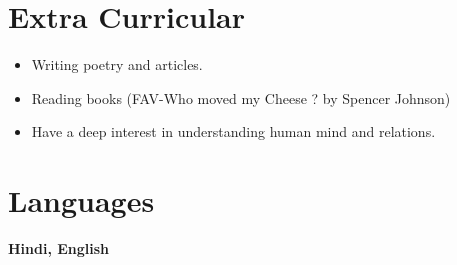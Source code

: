 \documentclass[a4,10pt]{article}
\newenvironment{zitemize}{
\begin{itemize}\itemsep2pt \parskip0pt \parsep1pt}
{\end{itemize}\vspace{-0.5cm}}
\newcommand{\hskills}[1]{
\textbf{\bfseries #1} }
\begin{document}
\section{Extra Curricular} 
 \begin{zitemize}
       \item Writing poetry and articles. 
    \end{zitemize}
\begin{zitemize}
     \item Reading books (FAV-Who moved my Cheese ? by Spencer Johnson)     
    \end{zitemize}
    \begin{zitemize}
     \item Have a deep interest in understanding human mind and relations.    
    \end{zitemize}


\section{Languages}
\vspace{-0.2cm}

\hskills{Hindi, English} \\ %


\end{document}
